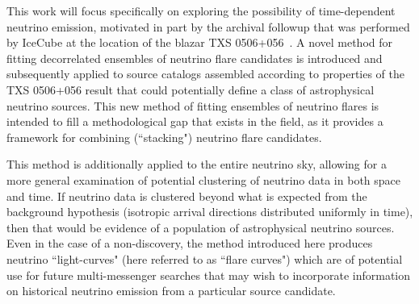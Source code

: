 This work will focus specifically on exploring the possibility of time-dependent neutrino emission, motivated in part by the archival followup that was performed by IceCube at the location of the blazar TXS 0506+056~\cite{TXS_Archival}. A novel method for fitting decorrelated ensembles of neutrino flare candidates is introduced and subsequently applied to source catalogs assembled according to properties of the TXS 0506+056 result that could potentially define a class of astrophysical neutrino sources. This new method of fitting ensembles of neutrino flares is intended to fill a methodological gap that exists in the field, as it provides a framework for combining (``stacking") neutrino flare candidates. 

This method is additionally applied to the entire neutrino sky, allowing for a more general examination of potential clustering of neutrino data in both space and time. If neutrino data is clustered beyond what is expected from the background hypothesis (isotropic arrival directions distributed uniformly in time), then that would be evidence of a population of astrophysical neutrino sources. Even in the case of a non-discovery, the method introduced here produces neutrino ``light-curves" (here referred to as ``flare curves") which are of potential use for future multi-messenger searches that may wish to incorporate information on historical neutrino emission from a particular source candidate.  

